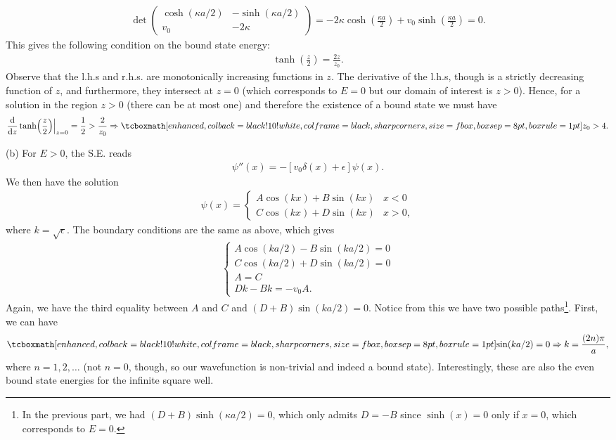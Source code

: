 {\begin{gather}
   \det\begin{pmatrix}
       \cosh(\kappa a/2) & -\sinh(\kappa a /2) \\
       v_0 & -2 \kappa
   \end{pmatrix}
   = -2 \kappa \cosh(\frac{\kappa a}{2}) + v_0 \sinh(\frac{\kappa a}{2}) = 0
.\end{gather}
This gives the following condition on the bound state energy:
\begin{eqnarray}
    \tanh(\frac{z}{2}) = \frac{2 z}{z_0}
.\end{eqnarray}
Observe that the l.h.s and r.h.s. are monotonically increasing functions in $z$.
The derivative of the l.h.s, though is a strictly decreasing function of $z$, and furthermore, they intersect at $z = 0$ (which corresponds to $E = 0$ but our domain of interest is $z > 0$).
Hence, for a solution in the region $z > 0$ (there can be at most one) and therefore the existence of a bound state we must have
\begin{eqnarray}
    \dv{z} \tanh(\frac{z}{2})\Big|_{z = 0} = \frac{1}{2} > \frac{2}{z_0} \Rightarrow \eqbox{ z_0 > 4 }
.\end{eqnarray}

(b) For $E > 0$, the S.E. reads
\begin{eqnarray}
    \psi''(x) = -[ v_0 \delta(x) + \epsilon ] \psi(x)
.\end{eqnarray}
We then have the solution
\begin{eqnarray}
   \psi(x) = \begin{cases}
       A \cos(k x) + B \sin(kx) & x < 0 \\
       C \cos(kx) + D \sin(kx) & x > 0
   ,\end{cases}
\end{eqnarray}
where $k = \sqrt{\epsilon}$.
The boundary conditions are the same as above, which gives
\begin{gather}
\begin{cases}
    A \cos(ka/2) - B \sin(ka/2) = 0 \\
    C \cos(ka/2) + D \sin(ka/2) = 0 \\
    A = C \\
    D k - B k = -v_0 A
.\end{cases}
\end{gather}
Again, we have the third equality between $A$ and $C$ and $(D + B)\sin(ka/2) = 0$.
Notice from this we have two possible paths\footnote{In the previous part, we had $(D + B)\sinh(\kappa a/2) = 0$, which only admits $D = -B$ since $\sinh(x) = 0$ only if $x = 0$, which corresponds to $E = 0$.}.
First, we can have
\begin{eqnarray}
    \eqbox{ \sin(k a/2) = 0 \Rightarrow k = \frac{(2n) \pi}{a} }
,\end{eqnarray}
where $n = 1,2,\ldots$ (not $n=0$, though, so our wavefunction is non-trivial and indeed a bound state).
Interestingly, these are also the even bound state energies for the infinite square well.

}
